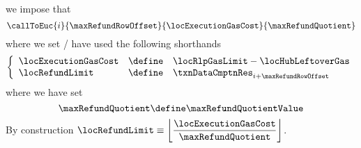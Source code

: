 \item[\underline{\underline{Row n$°(i + \maxRefundRowOffset)$: upper limit for refunds:}}]
	we impose that
	\[
		\callToEuc
		{i}{\maxRefundRowOffset}
		{\locExecutionGasCost}
		{\maxRefundQuotient}
	\]
	where we set / have used the following shorthands
	\[
		\left\{ \begin{array}{lcl}
			\locExecutionGasCost & \define & \locRlpGasLimit - \locHubLeftoverGas \\
			\locRefundLimit      & \define & \txnDataCmptnRes _{i + \maxRefundRowOffset}      \\
		\end{array} \right.
	\]
	where we have set
	\[
		\maxRefundQuotient \define \maxRefundQuotientValue
	\]
	\saNote{}
	By construction $\locRefundLimit \equiv \displaystyle \left\lfloor\frac{\locExecutionGasCost}\maxRefundQuotient\right\rfloor$.
